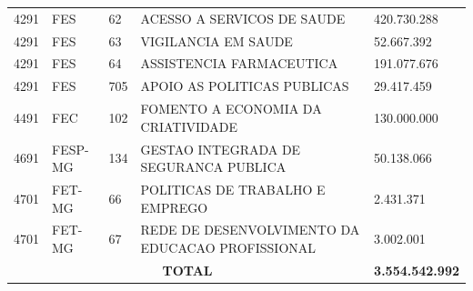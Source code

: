 \documentclass{article}
\begin{document}
\begin{longtable}[c]{m{1cm}|m{1.5cm}|m{1cm}m{10cm}|m{2cm}}
\multicolumn{1}{C{1cm}|}{4291} & \multicolumn{1}{L{1.5cm}|}{FES} & \multicolumn{1}{C{1cm}|}{62} & \multicolumn{1}{L{10cm}|}{ACESSO A SERVICOS DE SAUDE} & \multicolumn{1}{R{2cm}}{420.730.288} \\
\multicolumn{1}{C{1cm}|}{4291} & \multicolumn{1}{L{1.5cm}|}{FES} & \multicolumn{1}{C{1cm}|}{63} & \multicolumn{1}{L{10cm}|}{VIGILANCIA EM SAUDE} & \multicolumn{1}{R{2cm}}{52.667.392} \\
\multicolumn{1}{C{1cm}|}{4291} & \multicolumn{1}{L{1.5cm}|}{FES} & \multicolumn{1}{C{1cm}|}{64} & \multicolumn{1}{L{10cm}|}{ASSISTENCIA FARMACEUTICA} & \multicolumn{1}{R{2cm}}{191.077.676} \\
\multicolumn{1}{C{1cm}|}{4291} & \multicolumn{1}{L{1.5cm}|}{FES} & \multicolumn{1}{C{1cm}|}{705} & \multicolumn{1}{L{10cm}|}{APOIO AS POLITICAS PUBLICAS} & \multicolumn{1}{R{2cm}}{29.417.459} \\
\multicolumn{1}{C{1cm}|}{4491} & \multicolumn{1}{L{1.5cm}|}{FEC} & \multicolumn{1}{C{1cm}|}{102} & \multicolumn{1}{L{10cm}|}{FOMENTO A ECONOMIA DA CRIATIVIDADE} & \multicolumn{1}{R{2cm}}{130.000.000} \\
\multicolumn{1}{C{1cm}|}{4691} & \multicolumn{1}{L{1.5cm}|}{FESP-MG} & \multicolumn{1}{C{1cm}|}{134} & \multicolumn{1}{L{10cm}|}{GESTAO INTEGRADA DE SEGURANCA PUBLICA} & \multicolumn{1}{R{2cm}}{50.138.066} \\
\multicolumn{1}{C{1cm}|}{4701} & \multicolumn{1}{L{1.5cm}|}{FET-MG} & \multicolumn{1}{C{1cm}|}{66} & \multicolumn{1}{L{10cm}|}{POLITICAS DE TRABALHO E EMPREGO} & \multicolumn{1}{R{2cm}}{2.431.371} \\
\multicolumn{1}{C{1cm}|}{4701} & \multicolumn{1}{L{1.5cm}|}{FET-MG} & \multicolumn{1}{C{1cm}|}{67} & \multicolumn{1}{L{10cm}|}{REDE DE DESENVOLVIMENTO DA EDUCACAO PROFISSIONAL} & \multicolumn{1}{R{2cm}}{3.002.001} \\
\hline
\multicolumn{4}{c|}{ \textbf{TOTAL}} & \multicolumn{1}{R{2cm}}{ \textbf{3.554.542.992}} \\\hline\hline\end{longtable}\raggedright\fontsize{7pt}{10pt}\selectfont {Fonte: PPO.} \\\fontsize{7pt}{10pt}\selectfont {ELABORAÇÃO: DCAF/SCPPO/SEPLAG}\\\fontsize{7pt}{10pt}\selectfont {Nota: Na elaboração desse relatório foram consideradas as fontes de recurso 1, 2, 3, 4, 5, 6, 7, 8, 16, 17, 21, 24, 36, 37, 38, 56, 57, 62, 63, 64, 65, 73, 92, 93, 97 e 98.}\\
\end{document}
